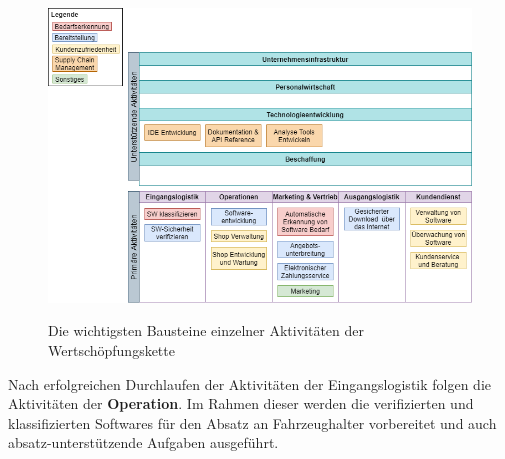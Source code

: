 \begin{figure}[!h]
	\hspace{-1cm}
	\includegraphics[width=\columnwidth]{pictures/wsk.png}
	\label{img:wsk}
	\caption{Die wichtigsten Bausteine einzelner Aktivitäten der Wertschöpfungskette}
\end{figure}
Nach erfolgreichen Durchlaufen der Aktivitäten der Eingangslogistik folgen die Aktivitäten der \textbf{Operation}. Im Rahmen dieser werden die verifizierten und klassifizierten Softwares für den Absatz an Fahrzeughalter vorbereitet und auch absatz-unterstützende Aufgaben ausgeführt.
